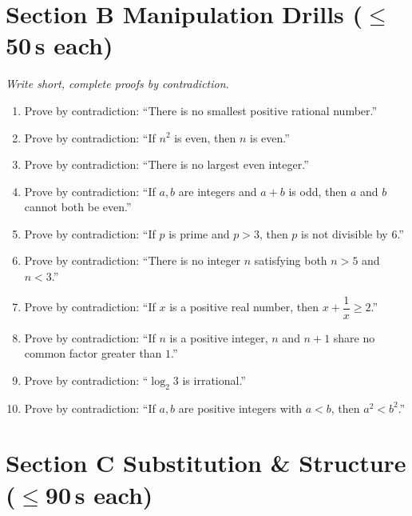 \documentclass[11pt,a4paper]{article}
\begin{document}
\section*{Section B \quad Manipulation Drills \hfill{\normalfont\small($\leq$50\,s each)}}

\noindent\textit{Write short, complete proofs by contradiction.}

\begin{enumerate}

\item Prove by contradiction: ``There is no smallest positive rational number.''

\item Prove by contradiction: ``If $n^2$ is even, then $n$ is even.''

\item Prove by contradiction: ``There is no largest even integer.''

\item Prove by contradiction: ``If $a,b$ are integers and $a+b$ is odd, then $a$ and $b$ cannot both be even.''

\item Prove by contradiction: ``If $p$ is prime and $p>3$, then $p$ is not divisible by $6$.''

\item Prove by contradiction: ``There is no integer $n$ satisfying both $n>5$ and $n<3$.''

\item Prove by contradiction: ``If $x$ is a positive real number, then $x+\dfrac1x \geq 2$.''

\item Prove by contradiction: ``If $n$ is a positive integer, $n$ and $n+1$ share no common factor greater than $1$.''

\item Prove by contradiction: ``$\log_2 3$ is irrational.''

\item Prove by contradiction: ``If $a,b$ are positive integers with $a<b$, then $a^2<b^2$.''

\end{enumerate}

\section*{Section C \quad Substitution \& Structure \hfill{\normalfont\small($\leq$90\,s each)}}
\end{document}
